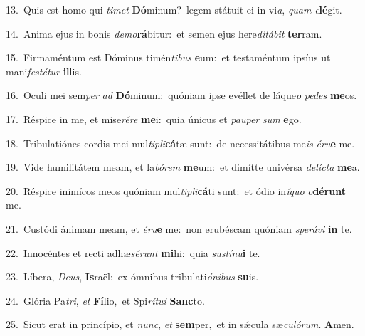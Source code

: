 {\numbfont\textcolor{\numbcolor}{13.}}~Quis est homo qui \textit{ti}\-\textit{met} \textbf{Dó}\-minum?~\star legem státuit ei in vi\-\textit{a}\-, \textit{quam} \textit{e}\-\textbf{lé}git.\par
{\numbfont\textcolor{\numbcolor}{14.}}~Anima ejus in bonis \textit{de}\-\textit{mo}\textbf{rá}bitur:~\star et semen ejus here\-\textit{di}\-\textit{tá}\textit{bit} \textbf{ter}\-ram.\par
{\numbfont\textcolor{\numbcolor}{15.}}~Firmaméntum est Dóminus timén\-\textit{ti}\-\textit{bus} \textbf{e}\-um:~\star et testaméntum ipsíus ut mani\-\textit{fes}\-\textit{té}\textit{tur} \textbf{il}\-lis.\par
{\numbfont\textcolor{\numbcolor}{16.}}~Oculi mei sem\textit{per} \textit{ad} \textbf{Dó}\-minum:~\star quóniam ipse evéllet de láque\textit{o} \textit{pe}\-\textit{des} \textbf{me}\-os.\par
{\numbfont\textcolor{\numbcolor}{17.}}~Réspice in me, et mise\-\textit{ré}\-\textit{re} \textbf{me}\-i:~\star quia únicus et \textit{pau}\-\textit{per} \textit{sum} \textbf{e}\-go.\par
{\numbfont\textcolor{\numbcolor}{18.}}~Tribulatiónes cordis mei mul\-\textit{ti}\-\textit{pli}\textbf{cá}tæ sunt:~\star de necessitátibus me\textit{is} \textit{é}\-\textit{ru}\textbf{e} me.\par
{\numbfont\textcolor{\numbcolor}{19.}}~Vide humilitátem meam, et la\-\textit{bó}\-\textit{rem} \textbf{me}\-um:~\star et dimítte univérsa \textit{de}\-\textit{líc}\textit{ta} \textbf{me}\-a.\par
{\numbfont\textcolor{\numbcolor}{20.}}~Réspice inimícos meos quóniam mul\-\textit{ti}\-\textit{pli}\textbf{cá}ti sunt:~\star et ódio in\-\textit{í}\-\textit{quo} \textit{o}\-\textbf{dé}\textbf{runt} me.\par
{\numbfont\textcolor{\numbcolor}{21.}}~Custódi ánimam meam, et \textit{é}\-\textit{ru}\textbf{e} me:~\star non erubéscam quóniam \textit{spe}\-\textit{rá}\textit{vi} \textbf{in} te.\par
{\numbfont\textcolor{\numbcolor}{22.}}~Innocéntes et recti adhæ\-\textit{sé}\-\textit{runt} \textbf{mi}\-hi:~\star quia \textit{sus}\-\textit{tí}\textit{nu}\textbf{i} te.\par
{\numbfont\textcolor{\numbcolor}{23.}}~Líbera, \textit{De}\-\textit{us}, \textbf{Is}\-raël:~\star ex ómnibus tribulati\-\textit{ó}\-\textit{ni}\textit{bus} \textbf{su}\-is.\par
{\numbfont\textcolor{\numbcolor}{24.}}~Glória Pa\-\textit{tri}\-, \textit{et} \textbf{Fí}\-lio,~\star et Spi\-\textit{rí}\-\textit{tu}\textit{i} \textbf{Sanc}\-to.\par
{\numbfont\textcolor{\numbcolor}{25.}}~Sicut erat in princípio, et \textit{nunc}\-, \textit{et} \textbf{sem}\-per,~\star et in sǽcula sæ\-\textit{cu}\-\textit{ló}\textit{rum}. \textbf{A}\-men.\par
